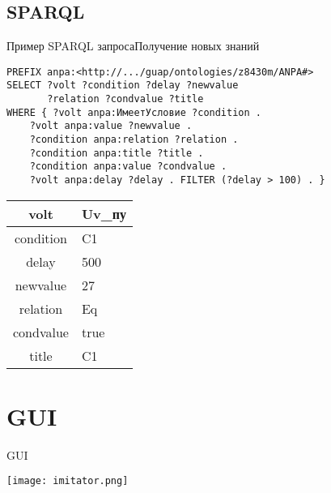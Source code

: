 \subsection{SPARQL}
\begin{frame}[fragile]{Пример SPARQL запроса}{Получение новых знаний}
    \begin{lstlisting}[language=sparql]
PREFIX anpa:<http://.../guap/ontologies/z8430m/ANPA#>
SELECT ?volt ?condition ?delay ?newvalue 
       ?relation ?condvalue ?title
WHERE { ?volt anpa:ИмеетУсловие ?condition .
    ?volt anpa:value ?newvalue .
    ?condition anpa:relation ?relation .
    ?condition anpa:title ?title .
    ?condition anpa:value ?condvalue .
    ?volt anpa:delay ?delay . FILTER (?delay > 100) . }
    \end{lstlisting}\vspace{-5mm}
    
    \begin{table}
        \begin{center}
            \begin{tabular}{cl}\hline
                volt & Uv\_пу \\\hline
                condition & C1 \\\hline
                delay & 500 \\\hline
                newvalue & 27 \\\hline
                relation & Eq \\\hline
                condvalue & true \\\hline
                title & C1 \\\hline
            \end{tabular}
        \end{center}
    \end{table}
\end{frame}


\section{GUI}
\begin{frame}{GUI}
    \begin{center}
        \texttt{[image: imitator.png]}
    \end{center}
\end{frame}

